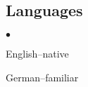 \documentclass[margin,line]{res}
\newenvironment{list2}{
  \begin{list}{$\bullet$}{%
      \setlength{\itemsep}{0in}
      \setlength{\parsep}{0in} \setlength{\parskip}{0in}
      \setlength{\topsep}{0in} \setlength{\partopsep}{0in} 
      \setlength{\leftmargin}{0.2in}}}{\end{list}}
\begin{document}
\begin{resume}
\vspace{-2mm}
\section{\sc Languages}

\begin{list2}
\item English--native
\item German--familiar
\end{list2}


\end{resume}
\end{document}
